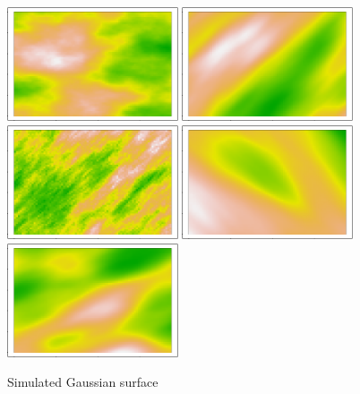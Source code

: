 \documentclass[article,nojss]{jss}\usepackage[]{graphicx}\usepackage[]{color}
\newenvironment{knitrout}{}{} %
\begin{document}
\begin{figure}[H]
\begin{knitrout}
\includegraphics[width=0.45\textwidth]{figure/maternplot-6} 
\includegraphics[width=0.45\textwidth]{figure/maternplot-7} 
\includegraphics[width=0.45\textwidth]{figure/maternplot-8} 
\includegraphics[width=0.45\textwidth]{figure/maternplot-9} 
\includegraphics[width=0.45\textwidth]{figure/maternplot-10} 
\end{knitrout}
\caption{Simulated Gaussian surface\label{fig:5} }
\end{figure}
\end{document}
